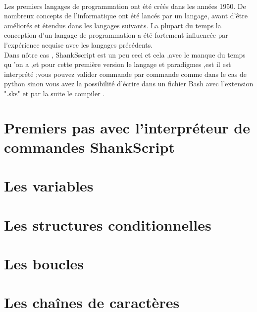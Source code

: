 \\
Les premiers langages de programmation ont été créés dans les années 1950. De nombreux concepts de l'informatique ont été lancés par un langage, avant d'être améliorés et étendus dans les langages suivants. La plupart du temps la conception d'un langage de programmation a été fortement influencée par l'expérience acquise avec les langages précédents.
\\[0.5cm]
Dans nôtre cas , ShankSscript est un peu ceci et cela ,avec le manque du temps qu 'on a ,et pour cette première version le langage et paradigmes ,est il est interprété ;vous pouvez valider commande par commande comme dans le cas de python sinon vous avez la possibilité d'écrire dans un fichier Bash avec l'extension ".sks" et par la suite le compiler .





\section{Premiers pas avec l'interpréteur de commandes ShankScript}


\section{Les variables}
\section{Les structures conditionnelles}
\section{Les boucles}
\section{Les chaînes de caractères}